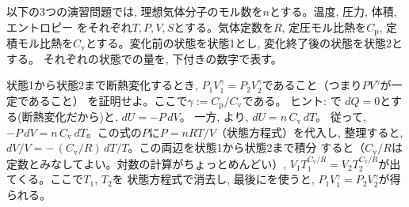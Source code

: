 以下の3つの演習問題では, 理想気体分子のモル数を$n$とする。温度, 圧力, 体積, エントロピー
をそれぞれ$T, P, V, S$とする。気体定数を$R$, 定圧モル比熱を$C_\text{p}$, 
定積モル比熱を$C_\text{v}$とする。変化前の状態を状態1とし, 変化終了後の状態を状態2とする。
それぞれの状態での量を, 下付きの数字で表す。

\begin{exq}\label{exq:adiabatic_change} 状態1から状態2まで断熱変化するとき, 
$P_1V_1^\gamma=P_2V_2^\gamma$であること（つまり$PV^{\gamma}$が一定であること）
を証明せよ。ここで$\gamma:=C_{\text{p}}/C_{\text{v}}$である。
{\small ヒント: で
$dQ=0$とする(断熱変化だから)と, $dU=-P\,dV$。
一方, より, $dU=n\,C_{\text{v}}\,dT$。
従って, $-P\,dV=n\,C_{\text{v}}\,dT$。この式の$P$に$P=nRT/V$（状態方程式）を代入し, 
整理すると, $dV/V=-\,(C_{\text{v}}/R)\,dT/T$。この両辺を状態1から状態2まで積分
すると（$C_{\text{v}}/R$は定数とみなしてよい。対数の計算がちょっとめんどい）, 
$V_1T_1^{C_\text{v}/R}=V_2T_2^{C_\text{v}/R}$が出てくる。ここで$T_1$, $T_2$を
状態方程式で消去し, 最後にを使うと, 
$P_1V_1^\gamma=P_2V_2^\gamma$が得られる。}
\end{exq}

